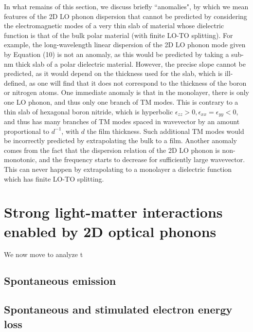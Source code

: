 \documentclass[aps,prb,twocolumn,
	groupedaddress,superscriptaddress,
	amsfonts,amssymb,amsmath,floatfix,
	citeautoscript]{revtex4-1}
\begin{document}
In what remains of this section, we discuss briefly ``anomalies", by which we mean features of the 2D LO phonon dispersion that cannot be predicted by considering the electromagnetic modes of a very thin slab of material whose dielectric function is that of the bulk polar material (with finite LO-TO splitting). For example, the long-wavelength linear dispersion of the 2D LO phonon mode given by Equation (10) is not an anomaly, as this would be predicted by taking a sub-nm thick slab of a polar dielectric material. However, the precise slope cannot be predicted, as it would depend on the thickness used for the slab, which is ill-defined, as one will find that it does not correspond to the thickness of the boron or nitrogen atoms. One immediate anomaly is that in the monolayer, there is only one LO phonon, and thus only one branch of TM modes. This is contrary to a thin slab of hexagonal boron nitride, which is hyperbolic $\epsilon_{zz} > 0, \epsilon_{xx} = \epsilon_{yy} < 0$, and thus has many branches of TM modes spaced in wavevector by an amount proportional to $d^{-1}$, with $d$ the film thickness. Such additional TM modes would be incorrectly predicted by extrapolating the bulk to a film. Another anomaly comes from the fact that the dispersion relation of the 2D LO phonon is non-monotonic, and the frequency starts to decrease for sufficiently large wavevector. This can never happen by extrapolating to a monolayer a dielectric function which has finite LO-TO splitting. 

\section{Strong light-matter interactions enabled by 2D optical phonons}

We now move to analyze t

\subsection{Spontaneous emission}

\subsection{Spontaneous and stimulated electron energy loss}
\end{document}
